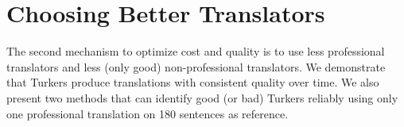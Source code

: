 \documentclass[11pt,letterpaper]{article}
\begin{document}


\section{Choosing Better Translators}

The second mechanism to optimize cost and quality is to use less professional translators and less (only good) non-professional translators. We demonstrate that Turkers produce translations with consistent quality over time. We also present two methods that can identify good (or bad) Turkers reliably using only one professional translation on 180 sentences as reference. 
\end{document}
